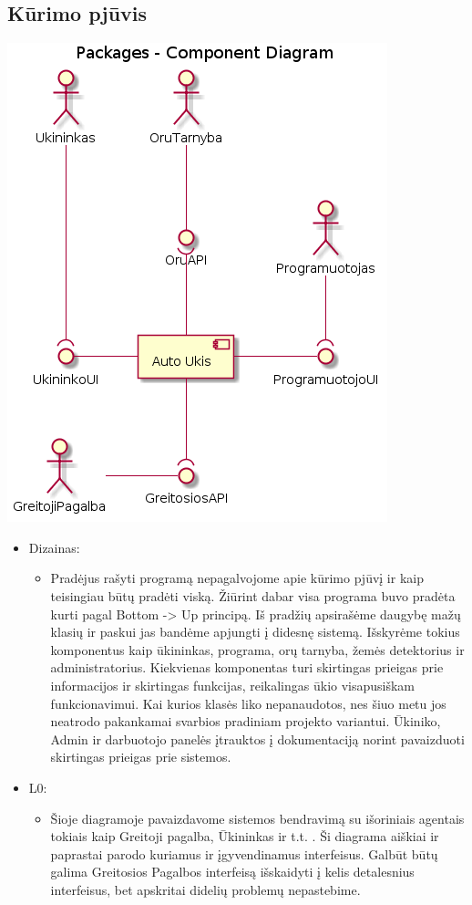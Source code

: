 ﻿\documentclass[oneside]{VUMIFPSkursinis}
\begin{document}
\subsection{Kūrimo pjūvis}
\includegraphics{l0.png}	
	\pagebreak
	\begin{itemize}
		\item Dizainas: 
		\begin{itemize}
			\item Pradėjus rašyti programą nepagalvojome apie kūrimo pjūvį ir kaip teisingiau būtų pradėti viską. Žiūrint dabar visa programa buvo pradėta kurti pagal Bottom -> Up principą. Iš pradžių apsirašėme daugybę mažų klasių ir paskui jas bandėme apjungti į didesnę sistemą. Išskyrėme tokius komponentus kaip ūkininkas, programa, orų tarnyba, žemės detektorius ir administratorius. Kiekvienas komponentas turi skirtingas prieigas prie informacijos ir skirtingas funkcijas, reikalingas ūkio visapusiškam funkcionavimui. Kai kurios klasės liko nepanaudotos, nes šiuo metu jos neatrodo pakankamai svarbios pradiniam projekto variantui. Ūkiniko, Admin ir darbuotojo panelės įtrauktos į dokumentaciją norint pavaizduoti skirtingas prieigas prie sistemos.
		\end{itemize}
		\item L0:
		\begin{itemize}
			\item Šioje diagramoje pavaizdavome sistemos bendravimą su išoriniais agentais tokiais kaip Greitoji pagalba, Ūkininkas ir t.t. . Ši diagrama aiškiai ir paprastai parodo kuriamus ir įgyvendinamus interfeisus. Galbūt būtų galima Greitosios Pagalbos interfeisą išskaidyti į kelis detalesnius interfeisus, bet apskritai didelių problemų nepastebime.

		\end{itemize}
	\end{itemize}
\end{document}
